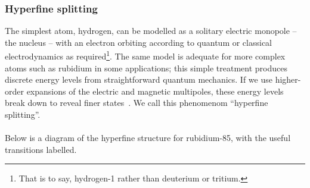 \documentclass[11pt,twoside,a4paper]{article}
\begin{document}
\subsubsection{Hyperfine splitting}
The simplest atom, hydrogen, can be modelled as a solitary electric monopole -- the nucleus -- with an electron orbiting according to quantum or classical electrodynamics as required\footnote{That is to say, hydrogen-1 rather than deuterium or tritium.}. The same
model is adequate for more complex atoms such as rubidium in some applications; this simple treatment produces discrete energy levels from straightforward quantum mechanics. If we use higher-order expansions
of the electric and magnetic multipoles, these energy levels break down to reveal finer states~\cite{satspec}. We call this phenomenom ``hyperfine splitting''.
\\\\
Below is a diagram of the hyperfine structure for rubidium-85, with the useful transitions labelled.
\end{document}
